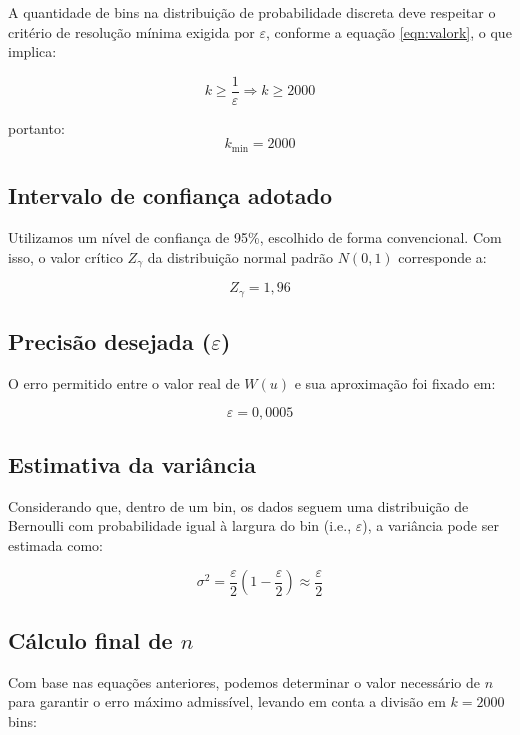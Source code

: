 \documentclass[12pt, a4paper]{article}
\begin{document}
A quantidade de bins na distribuição de probabilidade discreta deve respeitar o critério de resolução mínima exigida por \( \varepsilon \), conforme a equação \ref{eqn:valork}, o que implica:

\begin{equation}
    k \geq \frac{1}{\varepsilon} \Rightarrow k \geq 2000
    \label{eqn:valork}
\end{equation}

portanto:
\[
k_{\text{min}} = 2000
\]


\subsection{Intervalo de confiança adotado}

Utilizamos um nível de confiança de 95\%, escolhido de forma convencional. Com isso, o valor crítico \( Z_\gamma \) da distribuição normal padrão \( N(0,1) \) corresponde a:

\[
Z_\gamma = 1{,}96
\]

\subsection{Precisão desejada (\( \varepsilon \))}

O erro permitido entre o valor real de \( W(u) \) e sua aproximação foi fixado em:

\[
\varepsilon = 0{,}0005
\]

\subsection{Estimativa da variância}

Considerando que, dentro de um bin, os dados seguem uma distribuição de Bernoulli com probabilidade igual à largura do bin (i.e., \( \varepsilon \)), a variância pode ser estimada como:

\begin{equation}
    \sigma^2 = \frac{\varepsilon}{2} \left(1 - \frac{\varepsilon}{2} \right) \approx \frac{\varepsilon}{2}
    \label{eqn:valorsig}
\end{equation}

\subsection{Cálculo final de \( n \)}

Com base nas equações anteriores, podemos determinar o valor necessário de \( n \) para garantir o erro máximo admissível, levando em conta a divisão em \( k = 2000 \) bins:
\end{document}
